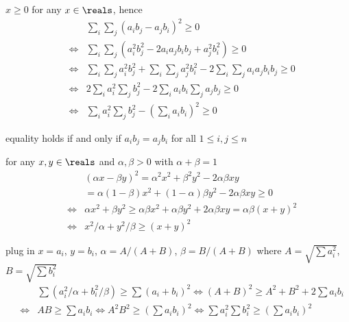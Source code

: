\documentclass[17pt,landscape]{foils}
\begin{document}
{

\bit
	\item $x\geq0$ for any $x\in\reals$, hence
		\begin{eqnarray*}
			&&
				\sum_i \sum_j (a_ib_j - a_jb_i)^2 \geq0
			\\
			&\Leftrightarrow&
				\sum_i \sum_j (a_i^2b_j^2 - 2a_ia_jb_ib_j + a_j^2b_i^2) \geq0
			\\
			&\Leftrightarrow&
				\sum_i \sum_j a_i^2b_j^2 + \sum_i \sum_j a_j^2b_i^2 -2 \sum_i \sum_j a_ia_jb_ib_j \geq 0
			\\
			&\Leftrightarrow&
				2 \sum_i a_i^2 \sum_j b_j^2 - 2 \sum_i a_ib_i \sum_j a_jb_j \geq 0
			\\
			&\Leftrightarrow&
				\sum_i a_i^2 \sum_j b_j^2 - \left(\sum_i a_ib_i\right)^2 \geq0
		\end{eqnarray*}
	\bit
		\item equality holds if and only if $a_ib_j=a_jb_i$ for all $1\leq i,j\leq n$
	\eit
\eit



\bit
	\item for any $x,y\in\reals$ and $\alpha,\beta>0$ with $\alpha + \beta = 1$
	\begin{eqnarray*}
	&&
			(\alpha x - \beta y)^2
		=
			\alpha^2 x^2 + \beta^2 y^2 - 2\alpha \beta xy
	\\
	&&
		=
			\alpha(1-\beta) x^2 + (1-\alpha)\beta y^2 - 2\alpha \beta xy
		\geq
			0
	\\
	&\Leftrightarrow&
			\alpha x^2 + \beta y^2
		\geq
			\alpha \beta x^2 + \alpha \beta y^2 + 2\alpha \beta xy
			= \alpha \beta (x+y)^2
	\\
	&\Leftrightarrow&
			x^2 / \alpha + y^2 / \beta \geq (x+y)^2
	\end{eqnarray*}

	\item plug in $x=a_i$, $y=b_i$, $\alpha = A/(A+B)$, $\beta=B/(A+B)$
	where $A = \sqrt{\sum a_i^2}$, $B = \sqrt{\sum b_i^2}$
	\begin{eqnarray*}
	&&
		\sum (a_i^2 / \alpha + b_i^2 / \beta) \geq \sum (a_i+b_i)^2
	\Leftrightarrow
		(A+B)^2 \geq A^2 + B^2 + 2 \sum a_i b_i
	\\
	&\Leftrightarrow&
		AB \geq \sum a_i b_i
	\Leftrightarrow
		A^2B^2 \geq \left(\sum a_i b_i\right)^2
	\Leftrightarrow
		{\sum a_i^2}{\sum b_i^2} \geq \left(\sum a_i b_i \right)^2
	\end{eqnarray*}
\eit



}
\end{document}
